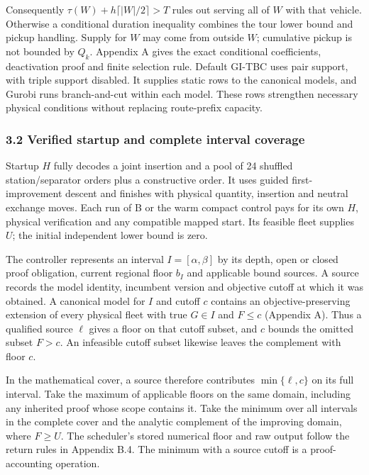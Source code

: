 \documentclass[
  american,
  11pt,
]{article}
\begin{document}
Consequently \(\tau(W)+h\lceil|W|/2\rceil>T\) rules out serving all of
\(W\) with that vehicle. Otherwise a conditional duration inequality
combines the tour lower bound and pickup handling. Supply for \(W\) may
come from outside \(W\); cumulative pickup is not bounded by \(Q_k\).
Appendix A gives the exact conditional coefficients, deactivation proof
and finite selection rule. Default GI-TBC uses pair support, with triple
support disabled. It supplies static rows to the canonical models, and
Gurobi runs branch-and-cut within each model. These rows strengthen
necessary physical conditions without replacing route-prefix capacity.

\subsubsection{3.2 Verified startup and complete interval
coverage}\label{verified-startup-and-complete-interval-coverage}

Startup \(H\) fully decodes a joint insertion and a pool of 24 shuffled
station/separator orders plus a constructive order. It uses guided
first-improvement descent and finishes with physical quantity, insertion
and neutral exchange moves. Each run of B or the warm compact control
pays for its own \(H\), physical verification and any compatible mapped
start. Its feasible fleet supplies \(U\); the initial independent lower
bound is zero.

The controller represents an interval \(I=[\alpha,\beta]\) by its depth,
open or closed proof obligation, current regional floor \(b_I\) and
applicable bound sources. A source records the model identity, incumbent
version and objective cutoff at which it was obtained. A canonical model
for \(I\) and cutoff \(c\) contains an objective-preserving extension of
every physical fleet with true \(G\in I\) and \(F\le c\) (Appendix A).
Thus a qualified source \(\ell\) gives a floor on that cutoff subset,
and \(c\) bounds the omitted subset \(F>c\). An infeasible cutoff subset
likewise leaves the complement with floor \(c\).

In the mathematical cover, a source therefore contributes
\(\min\{\ell,c\}\) on its full interval. Take the maximum of applicable
floors on the same domain, including any inherited proof whose scope
contains it. Take the minimum over all intervals in the complete cover
and the analytic complement of the improving domain, where \(F\ge U\).
The scheduler's stored numerical floor and raw output follow the return
rules in Appendix B.4. The minimum with a source cutoff is a
proof-accounting operation.
\end{document}
